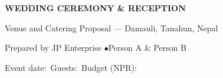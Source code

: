 \documentclass[12pt,a4paper]{article}
\begin{document}
\begin{center}
{\Large\bfseries\color{weddingwine} WEDDING CEREMONY \& RECEPTION}\par
\vspace{7pt}
{\large\color{weddinggold} Venue and Catering Proposal --- Damauli, Tanahun, Nepal}\par
\vspace{8pt}
Prepared by JP Enterprise \quad$\bullet$\quad Person A \& Person B
\end{center}
\vspace{8pt}
\noindent Event date:\ \underline{\hspace{35mm}}\qquad Guests:\ \underline{\hspace{24mm}}\qquad Budget (NPR):\ \underline{\hspace{25mm}}
\clearpage
\begin{singlespace}\tableofcontents\end{singlespace}
\clearpage




\end{document}
